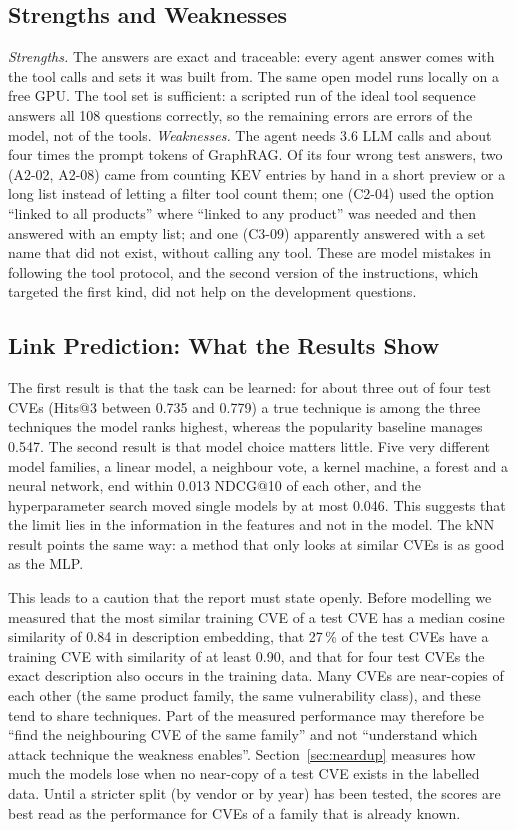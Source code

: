 \documentclass[12pt, a4paper]{article}
\begin{document}
\subsection{Strengths and Weaknesses}\label{sec:strengths}
\emph{Strengths.} The answers are exact and traceable: every agent answer comes with the tool calls and sets it was built from. The same open model runs locally on a free GPU. The tool set is sufficient: a scripted run of the ideal tool sequence answers all 108 questions correctly, so the remaining errors are errors of the model, not of the tools. \emph{Weaknesses.} The agent needs 3.6 LLM calls and about four times the prompt tokens of GraphRAG. Of its four wrong test answers, two (A2-02, A2-08) came from counting KEV entries by hand in a short preview or a long list instead of letting a filter tool count them; one (C2-04) used the option ``linked to all products'' where ``linked to any product'' was needed and then answered with an empty list; and one (C3-09) apparently answered with a set name that did not exist, without calling any tool. These are model mistakes in following the tool protocol, and the second version of the instructions, which targeted the first kind, did not help on the development questions.
\subsection{Link Prediction: What the Results Show}\label{sec:lpdiscussion}
The first result is that the task can be learned: for about three out of four test CVEs (Hits@3 between 0.735 and 0.779) a true technique is among the three techniques the model ranks highest, whereas the popularity baseline manages 0.547. The second result is that model choice matters little. Five very different model families, a linear model, a neighbour vote, a kernel machine, a forest and a neural network, end within 0.013 NDCG@10 of each other, and the hyperparameter search moved single models by at most 0.046. This suggests that the limit lies in the information in the features and not in the model. The kNN result points the same way: a method that only looks at similar CVEs is as good as the MLP.

This leads to a caution that the report must state openly. Before modelling we measured that the most similar training CVE of a test CVE has a median cosine similarity of 0.84 in description embedding, that 27\,\% of the test CVEs have a training CVE with similarity of at least 0.90, and that for four test CVEs the exact description also occurs in the training data. Many CVEs are near-copies of each other (the same product family, the same vulnerability class), and these tend to share techniques. Part of the measured performance may therefore be ``find the neighbouring CVE of the same family'' and not ``understand which attack technique the weakness enables''. Section~\ref{sec:neardup} measures how much the models lose when no near-copy of a test CVE exists in the labelled data. Until a stricter split (by vendor or by year) has been tested, the scores are best read as the performance for CVEs of a family that is already known.
\end{document}
